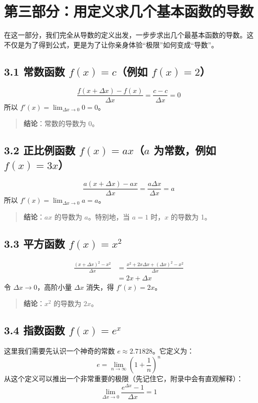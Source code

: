 \documentclass[10pt]{article}
\begin{document}
\section*{第三部分：用定义求几个基本函数的导数}

在这一部分，我们完全从导数的定义出发，一步步求出几个最基本函数的导数。这不仅是为了得到公式，更是为了让你亲身体验“极限”如何变成“导数”。

\subsection*{3.1 常数函数 $f(x) = c$（例如 $f(x)=2$）}
\[
\frac{f(x+\Delta x)-f(x)}{\Delta x} = \frac{c - c}{\Delta x} = 0
\]
所以 $f'(x) = \lim_{\Delta x \to 0} 0 = 0$。

\begin{quote}
\textbf{结论}：常数的导数为 0。
\end{quote}

\subsection*{3.2 正比例函数 $f(x) = ax$（$a$ 为常数，例如 $f(x)=3x$）}
\[
\frac{a(x+\Delta x) - a x}{\Delta x} = \frac{a\Delta x}{\Delta x} = a
\]
所以 $f'(x) = \lim_{\Delta x \to 0} a = a$。

\begin{quote}
\textbf{结论}：$ax$ 的导数为 $a$。特别地，当 $a=1$ 时，$x$ 的导数为 1。
\end{quote}

\subsection*{3.3 平方函数 $f(x) = x^2$}
\[
\begin{aligned}
\frac{(x+\Delta x)^2 - x^2}{\Delta x} &= \frac{x^2 + 2x\Delta x + (\Delta x)^2 - x^2}{\Delta x} \\
&= 2x + \Delta x
\end{aligned}
\]
令 $\Delta x \to 0$，高阶小量 $\Delta x$ 消失，得 $f'(x) = 2x$。

\begin{quote}
\textbf{结论}：$x^2$ 的导数为 $2x$。
\end{quote}

\subsection*{3.4 指数函数 $f(x) = e^x$}
这里我们需要先认识一个神奇的常数 $e \approx 2.71828$。它定义为：
\[
e = \lim_{n \to \infty} \left(1 + \frac{1}{n}\right)^n
\]
从这个定义可以推出一个非常重要的极限（先记住它，附录中会有直观解释）：
\[
\lim_{\Delta x \to 0} \frac{e^{\Delta x} - 1}{\Delta x} = 1
\]
\end{document}
